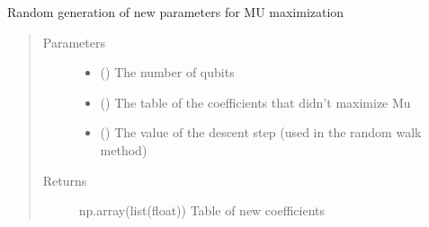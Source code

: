 \documentclass[letterpaper,10pt,english]{sphinxmanual}
\begin{document}

\begin{fulllineitems}
\label{\detokenize{mermin_polynomials-opti:mermin_on_qiskit.hypergraphstates_optimization.mermin_polynomials.new_coefficients_generation}}
Random generation of new parameters for MU maximization
\begin{quote}\begin{description}
\item[{Parameters}] \leavevmode\begin{itemize}
\item {} 
 () \textendash{} The number of qubits

\item {} 
 (\sphinxstyleliteralemphasis{\sphinxupquote{(}}\sphinxstyleliteralemphasis{\sphinxupquote{(}}\sphinxstyleliteralemphasis{\sphinxupquote{)}}\sphinxstyleliteralemphasis{\sphinxupquote{)}}) \textendash{} The table of the coefficients 
that didn’t maximize Mu

\item {} 
 () \textendash{} The value of the descent step (used in the random walk 
method)

\end{itemize}

\item[{Returns}] \leavevmode
np.array(list(float)) \textendash{} Table of new coefficients

\end{description}\end{quote}

\end{fulllineitems}
\end{document}
